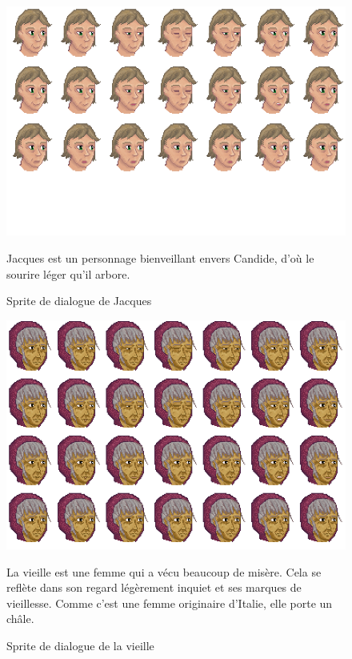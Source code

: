 \documentclass[11pt]{article}
\begin{document}
\begin{appendices}
\begin{figure}[H]
\includegraphics[scale=0.4]{jacquesFaceAnimation}
\centering
\caption{Sprite de dialogue de Jacques}
Jacques est un personnage bienveillant envers Candide, d'où le sourire léger qu'il arbore.
\end{figure}

\begin{figure}[H]
\includegraphics[scale=0.4]{vieilleFaceAnimation}
\centering
\caption{Sprite de dialogue de la vieille}
La vieille est une femme qui a vécu beaucoup de misère. Cela se reflète dans son regard légèrement inquiet et ses marques de vieillesse. Comme c'est une femme originaire d'Italie, elle porte un châle.
\end{figure}


\end{appendices}
\end{document}
